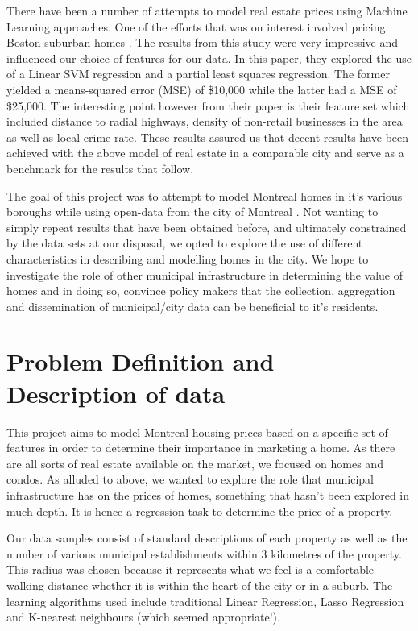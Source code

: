 \documentclass{acm_proc_article-sp}
\begin{document}
	There have been a number of attempts to model real estate prices using Machine Learning approaches. One of the efforts that was on interest involved pricing Boston suburban homes \cite{bostonres}. The results from this study were very impressive and influenced our choice of features for our data. In this paper, they explored the use of a Linear SVM regression and a partial least squares regression. The former yielded a means-squared error (MSE) of \$10,000 while the latter had a MSE of \$25,000. The interesting point however from their paper is their feature set which included distance to radial highways, density of non-retail businesses in the area as well as local crime rate. These results assured us that decent results have been achieved with the above model of real estate in a comparable city and serve as a benchmark for the results that follow. 
	
	The goal of this project was to attempt to model Montreal homes in it's various boroughs while using open-data from the city of Montreal \cite{data}. Not wanting to simply repeat results that have been obtained before, and ultimately constrained by the data sets at our disposal, we opted to explore the use of different characteristics in describing and modelling homes in the city. We hope to investigate the role of other municipal infrastructure in determining the value of homes and in doing so, convince policy makers that the collection, aggregation and dissemination of municipal/city data can be beneficial to it's residents.

\section{Problem Definition and Description of data}
	
	This project aims to model Montreal housing prices based on a specific set of features in order to determine their importance in marketing a home. As there are all sorts of real estate available on the market, we focused on homes and condos. As alluded to above, we wanted to explore the role that municipal infrastructure has on the prices of homes, something that hasn't been explored in much depth. It is hence a regression task to determine the price of a property.
	
	Our data samples consist of standard descriptions of each property as well as the number of various municipal establishments within 3 kilometres of the property. This radius was chosen because it represents what we feel is a comfortable walking distance whether it is within the heart of the city or in a suburb. The learning algorithms used include traditional Linear Regression, Lasso Regression and K-nearest neighbours (which seemed appropriate!). 
\end{document}
